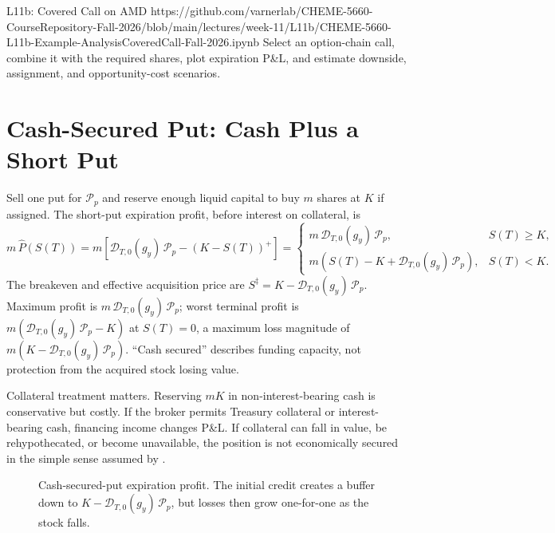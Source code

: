 \documentclass[11pt]{article}
\begin{document}
\notebooklink
  {L11b: Covered Call on AMD}
  {https://github.com/varnerlab/CHEME-5660-CourseRepository-Fall-2026/blob/main/lectures/week-11/L11b/CHEME-5660-L11b-Example-AnalysisCoveredCall-Fall-2026.ipynb}
  {Select an option-chain call, combine it with the required shares, plot expiration P\&L, and estimate downside, assignment, and opportunity-cost scenarios.}

\section{Cash-Secured Put: Cash Plus a Short Put}

Sell one put for $\mathcal P_p$ and reserve enough liquid capital to buy $m$ shares at $K$ if assigned. The short-put expiration profit, before interest on collateral, is
\begin{equation}
  \label{eq:csp-profit}
  m\,\hat P(S(T))
  =m\left[\mathcal D_{T,0}(g_y)\,\mathcal P_p-(K-S(T))^+\right]
  =
  \begin{cases}
    m\,\mathcal D_{T,0}(g_y)\,\mathcal P_p, & S(T)\geq K,\\
    m\left(S(T)-K+\mathcal D_{T,0}(g_y)\,\mathcal P_p\right), & S(T)<K.
  \end{cases}
\end{equation}
The breakeven and effective acquisition price are $S^{\ddagger}=K-\mathcal D_{T,0}(g_y)\,\mathcal P_p$. Maximum profit is $m\,\mathcal D_{T,0}(g_y)\,\mathcal P_p$; worst terminal profit is $m\left(\mathcal D_{T,0}(g_y)\,\mathcal P_p-K\right)$ at $S(T)=0$, a maximum loss magnitude of $m\left(K-\mathcal D_{T,0}(g_y)\,\mathcal P_p\right)$. ``Cash secured'' describes funding capacity, not protection from the acquired stock losing value.

Collateral treatment matters. Reserving $mK$ in non-interest-bearing cash is conservative but costly. If the broker permits Treasury collateral or interest-bearing cash, financing income changes P\&L. If collateral can fall in value, be rehypothecated, or become unavailable, the position is not economically secured in the simple sense assumed by .

\begin{figure}[ht]
  \centering
  \caption{Cash-secured-put expiration profit. The initial credit creates a buffer down to $K-\mathcal D_{T,0}(g_y)\,\mathcal P_p$, but losses then grow one-for-one as the stock falls.}
  \label{fig:csp}
\end{figure}
\end{document}
